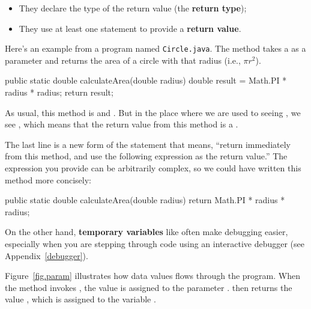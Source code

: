 
\begin{itemize}

\item They declare the type of the return value (the {\bf return type});

\item They use at least one  statement to provide a {\bf return value}.

\end{itemize}

Here's an example from a program named {\tt Circle.java}.
The  method takes a  as a parameter and returns the area of a circle with that radius (i.e., $\pi r^2$).

\begin{code}
public static double calculateArea(double radius) {
    double result = Math.PI * radius * radius;
    return result;
}
\end{code}

As usual, this method is  and .
But in the place where we are used to seeing , we see , which means that the return value from this method is a .


The last line is a new form of the  statement that means, ``return immediately from this method, and use the following expression as the return value.''
The expression you provide can be arbitrarily complex, so we could have written this method more concisely:

\begin{code}
public static double calculateArea(double radius) {
    return Math.PI * radius * radius;
}
\end{code}


On the other hand, {\bf temporary variables} like  often make debugging easier, especially when you are stepping through code using an interactive debugger (see Appendix~\ref{debugger}).

Figure~\ref{fig.param} illustrates how data values flows through the program.
When the  method invokes , the value  is assigned to the parameter .
 then returns the value , which is assigned to the variable .

